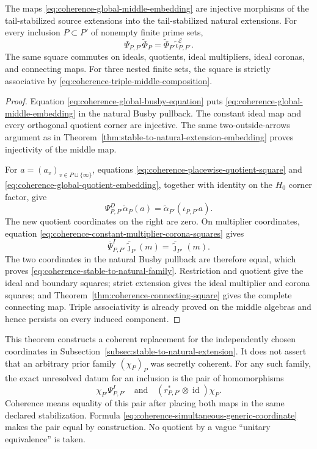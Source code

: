 \begin{theorem}
\label{thm:coherence-stable-to-natural-family}
The maps \eqref{eq:coherence-global-middle-embedding} are injective morphisms
of the tail-stabilized source extensions into the tail-stabilized natural
extensions.  For every inclusion $P\subset P'$ of nonempty finite prime sets,
\begin{equation}
 \Psi_{P,P'}\widetilde\Phi_P
 =\widetilde\Phi_{P'}\widetilde\iota^{\mathcal E}_{P,P'}.
 \label{eq:coherence-stable-to-natural-family}
\end{equation}
The same square commutes on ideals, quotients, ideal multipliers, ideal
coronas, and connecting maps.  For three nested finite sets, the square is
strictly associative by
\eqref{eq:coherence-triple-middle-composition}.
\end{theorem}

\begin{proof}
Equation \eqref{eq:coherence-global-busby-equation} puts
\eqref{eq:coherence-global-middle-embedding} in the natural Busby pullback.
The constant ideal map and every orthogonal quotient corner are injective.
The same two-outside-arrows argument as in
Theorem~\ref{thm:stable-to-natural-extension-embedding} proves injectivity of
the middle map.

For $a=(a_v)_{v\in P\sqcup\{\infty\}}$, equations
\eqref{eq:coherence-placewise-quotient-square} and
\eqref{eq:coherence-global-quotient-embedding}, together with identity on the
$H_0$ corner factor, give
\[
 \Psi^D_{P,P'}\widetilde\alpha_P(a)
 =\widetilde\alpha_{P'}(\iota_{P,P'}a).
\]
The new quotient coordinates on the right are zero.  On multiplier
coordinates, equation
\eqref{eq:coherence-constant-multiplier-corona-squares} gives
\[
 \overline\Psi^I_{P,P'}
 \overline{\widetilde\jmath}_P(m)
 =\overline{\widetilde\jmath}_{P'}(m).
\]
The two coordinates in the natural Busby pullback are therefore equal, which
proves \eqref{eq:coherence-stable-to-natural-family}.  Restriction and quotient
give the ideal and boundary squares; strict extension gives the ideal
multiplier and corona squares; and
Theorem~\ref{thm:coherence-connecting-square} gives the complete connecting
map.  Triple associativity is already proved on the middle algebras and hence
persists on every induced component.
\end{proof}

This theorem constructs a coherent replacement for the independently chosen
coordinates in Subsection~\ref{subsec:stable-to-natural-extension}.  It does
not assert that an arbitrary prior family $(\chi_P)_P$ was secretly coherent.
For any such family, the exact unresolved datum for an inclusion is the pair
of homomorphisms
\begin{equation}
 \chi_{P'}\Psi^I_{P,P'}
 \quad\text{and}\quad
 (r_{P,P'}^*\otimes\operatorname{id})\chi_P.
 \label{eq:coherence-arbitrary-choice-defect}
\end{equation}
Coherence means equality of this pair after placing both maps in the same
declared stabilization.  Formula
\eqref{eq:coherence-simultaneous-generic-coordinate} makes the pair equal by
construction.  No quotient by a vague ``unitary equivalence'' is taken.


